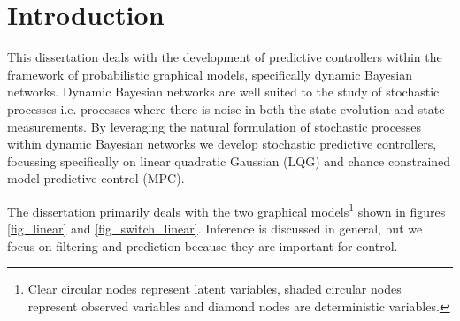 \chapter{Introduction}
This dissertation deals with the development of predictive controllers within the framework of probabilistic graphical models, specifically dynamic Bayesian networks. Dynamic Bayesian networks are well suited to the study of stochastic processes i.e. processes where there is noise in both the state evolution and state measurements. By leveraging the natural formulation of stochastic processes within dynamic Bayesian networks we develop stochastic predictive controllers, focussing specifically on linear quadratic Gaussian (LQG) and chance constrained model predictive control (MPC).

The dissertation primarily deals with the two graphical models\footnote{Clear circular nodes represent latent variables, shaded circular nodes represent observed variables and diamond nodes are deterministic variables.} shown in figures \ref{fig_linear} and \ref{fig_switch_linear}. Inference is discussed in general, but we focus on filtering and prediction because they are important for control. 
